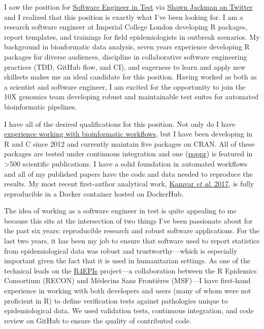 I saw the position for
\href{https://boards.greenhouse.io/10xgenomics/jobs/1769868?gh_jid=1769868#application}{Software
Engineer in Test} via
\href{https://twitter.com/sjackman/status/1189977010908454912?s=20}{Shawn
Jackman on Twitter} and I realized that this position is exactly what I've been
looking for. I am a research software engineer at Imperial College London
developing R packages, report templates, and trainings for field
epidemiologists in outbreak scenarios. My background in bionformatic data
analysis, seven years experience developing R packages for diverse audiences,
discipline in collaborative software engineering practices (TDD, GitHub flow,
and CI), and eagerness to learn and apply new skillsets makes me an ideal
candidate for this position. Having worked as both as a scientist and software
engineer, I am excited for the opportunity to join the 10X genomics team
developing robust and maintainable test suites for automated bioinformatic
pipelines.

\vspace{1ex}

I have all of the desired qualifications for this position. Not only do I have
\href{https://github.com/zkamvar/read-processing}{experience working with 
bioinformatic workflows}, but I have been developing in R and C since 2012
and currently maintain five packages on CRAN. All of these packages are tested
under continuous integration and one
(\href{https://grunwaldlab.github.io/poppr}{poppr}) is featured in
\textgreater500 scientific publications. I have a solid foundation in automated
workflows and all of my published papers have the code and data needed to
reproduce the results. My most recent first-author analytical work,
\href{https://peerj.com/articles/4152/}{Kamvar \textit{et al.} 2017}, is fully
reproducible in a Docker container hosted on DockerHub.

\vspace{1ex}

The idea of working as a software engineer in test is quite appealing to me
because this sits at the intersection of two things I've been passionate about
for the past six years: reproducible research and robust software applications.
For the last two years, it has been my job to ensure that software used to
report statistics from epidemiological data was robust and trustworthy---which
is especially important given the fact that it is used in humanitarian
settings. As one of the technical leads on the
\href{https://r4epis.netlify.com}{R4EPIs} project---a collaboration between the
R Epidemics Consortium (RECON) and M\'{e}decins Sans Fronti\`{e}res (MSF)---I
have first-hand experience in working with both developers and users (many of
whom were not proficient in R) to define verification tests against pathologies
unique to epidemiological data. We used validation tests, continuous
integration, and code review on GitHub to ensure the quality of contributed
code.

